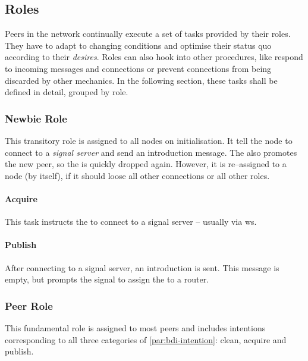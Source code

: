 \subsection{Roles}\label{sec:design-roles}
Peers in the network continually execute a set of tasks provided by their roles. They have to adapt to changing conditions and optimise their status quo according to their \textit{desires}. Roles can also hook into other procedures, like respond to incoming messages and connections or prevent connections from being discarded by other mechanics. In the following section, these tasks shall be defined in detail, grouped by role.

\subsubsection{Newbie Role}\label{sec:design-roles-newbie}
This transitory role is assigned to all nodes on initialisation. It tell the node to connect to a \textit{signal server} and send an introduction message. The \signalRole also promotes the new peer, so the \newbieRole is quickly dropped again. However, it is re–assigned to a node (by itself), if it should loose all other connections or all other roles.

\paragraph{Acquire}
\begin{itemize}
     This task instructs the \newbieRole to connect to a signal server – usually via \gls{ws}.
\end{itemize}

\paragraph{Publish}
\begin{itemize}
     After connecting to a signal server, an introduction is sent. This message is empty, but prompts the signal to assign the \newbieRole to a router.
\end{itemize}

\subsubsection{Peer Role}\label{sec:design-roles-peer}
This fundamental role is assigned to most peers and includes intentions corresponding to all three categories of \vref{par:bdi-intention}: clean, acquire and publish.

